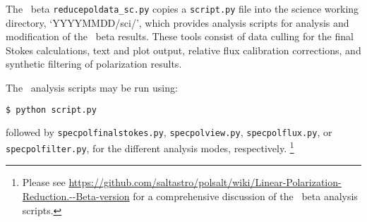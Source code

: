 The \polsalt\ beta \texttt{reducepoldata\_sc.py} copies a \texttt{script.py} file into the science working directory, `YYYYMMDD/sci/', which provides analysis scripts for analysis and modification of the \polsalt\ beta results. These tools consist of data culling for the final Stokes calculations, text and plot output, relative flux calibration corrections, and synthetic filtering of polarization results.

The \polsalt\ analysis scripts may be run using:
\begin{lstlisting}[language=bash]
$ python script.py
\end{lstlisting}
{\parskip=0pt followed} by \texttt{specpolfinalstokes.py}, \texttt{specpolview.py}, \texttt{specpolflux.py}, or \texttt{specpol\-filter.py}, for the different analysis modes, respectively.%
\footnote{Please see \url{https://github.com/saltastro/polsalt/wiki/Linear-Polarization-Reduction.--Beta-version} for a comprehensive discussion of the \polsalt\ beta analysis scripts.}
